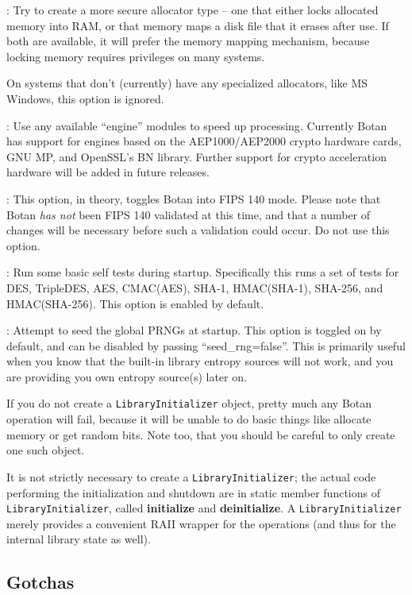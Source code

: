 \documentclass{article}
\newcommand{\function}[1]{\textbf{#1}}
\newcommand{\type}[1]{\texttt{#1}}
\begin{document}
: Try to create a more secure allocator type --
one that either locks allocated memory into RAM, or that memory maps a
disk file that it erases after use. If both are available, it will
prefer the memory mapping mechanism, because locking memory requires
privileges on many systems.

On systems that don't (currently) have any specialized allocators, like
MS Windows, this option is ignored.

: Use any available ``engine'' modules to speed
up processing. Currently Botan has support for engines based on the
AEP1000/AEP2000 crypto hardware cards, GNU MP, and OpenSSL's BN
library. Further support for crypto acceleration hardware will be
added in future releases.

: This option, in theory, toggles Botan into FIPS 140
mode. Please note that Botan \emph{has not} been FIPS 140 validated at
this time, and that a number of changes will be necessary before such
a validation could occur. Do not use this option.

: Run some basic self tests during startup.
Specifically this runs a set of tests for DES, TripleDES, AES,
CMAC(AES), SHA-1, HMAC(SHA-1), SHA-256, and HMAC(SHA-256). This option
is enabled by default.

: Attempt to seed the global PRNGs at
startup. This option is toggled on by default, and can be disabled by passing
``seed\_rng=false''. This is primarily useful when you know that the built-in
library entropy sources will not work, and you are providing you own entropy
source(s) later on.

If you do not create a \type{LibraryInitializer} object, pretty much
any Botan operation will fail, because it will be unable to do basic
things like allocate memory or get random bits. Note too, that you
should be careful to only create one such object.

It is not strictly necessary to create a \type{LibraryInitializer};
the actual code performing the initialization and shutdown are in
static member functions of \type{LibraryInitializer}, called
\function{initialize} and \function{deinitialize}. A
\type{LibraryInitializer} merely provides a convenient RAII wrapper
for the operations (and thus for the internal library state as well).

\subsection{Gotchas}
\end{document}

